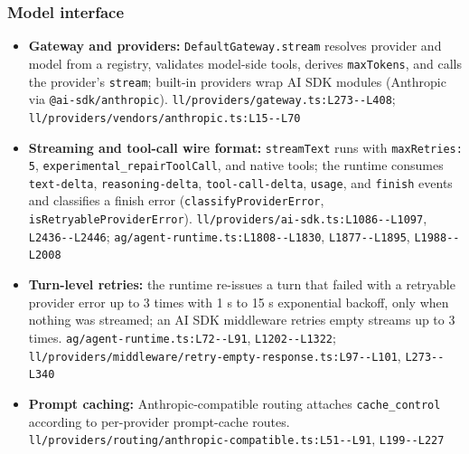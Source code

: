 \subsubsection*{Model interface}
\begin{itemize}
\item \textbf{Gateway and providers:} \texttt{DefaultGateway.\allowbreak{}stream} resolves provider and model from a registry, validates model-side tools, derives \texttt{maxTokens}, and calls the provider's \texttt{stream}; built-in providers wrap AI SDK modules (Anthropic via \texttt{@ai-\allowbreak{}sdk/\allowbreak{}anthropic}). \texttt{ll/\allowbreak{}providers/\allowbreak{}gateway.\allowbreak{}ts:\allowbreak{}L273-\allowbreak{}-\allowbreak{}L408}; \texttt{ll/\allowbreak{}providers/\allowbreak{}vendors/\allowbreak{}anthropic.\allowbreak{}ts:\allowbreak{}L15-\allowbreak{}-\allowbreak{}L70}
\item \textbf{Streaming and tool-call wire format:} \texttt{streamText} runs with \texttt{maxRetries:\allowbreak{} 5}, \texttt{experimental\_\allowbreak{}repairToolCall}, and native tools; the runtime consumes \texttt{text-\allowbreak{}delta}, \texttt{reasoning-\allowbreak{}delta}, \texttt{tool-\allowbreak{}call-\allowbreak{}delta}, \texttt{usage}, and \texttt{finish} events and classifies a finish error (\texttt{classifyProviderError}, \texttt{isRetryableProviderError}). \texttt{ll/\allowbreak{}providers/\allowbreak{}ai-\allowbreak{}sdk.\allowbreak{}ts:\allowbreak{}L1086-\allowbreak{}-\allowbreak{}L1097}, \texttt{L2436-\allowbreak{}-\allowbreak{}L2446}; \texttt{ag/\allowbreak{}agent-\allowbreak{}runtime.\allowbreak{}ts:\allowbreak{}L1808-\allowbreak{}-\allowbreak{}L1830}, \texttt{L1877-\allowbreak{}-\allowbreak{}L1895}, \texttt{L1988-\allowbreak{}-\allowbreak{}L2008}
\item \textbf{Turn-level retries:} the runtime re-issues a turn that failed with a retryable provider error up to 3 times with 1 s to 15 s exponential backoff, only when nothing was streamed; an AI SDK middleware retries empty streams up to 3 times. \texttt{ag/\allowbreak{}agent-\allowbreak{}runtime.\allowbreak{}ts:\allowbreak{}L72-\allowbreak{}-\allowbreak{}L91}, \texttt{L1202-\allowbreak{}-\allowbreak{}L1322}; \texttt{ll/\allowbreak{}providers/\allowbreak{}middleware/\allowbreak{}retry-\allowbreak{}empty-\allowbreak{}response.\allowbreak{}ts:\allowbreak{}L97-\allowbreak{}-\allowbreak{}L101}, \texttt{L273-\allowbreak{}-\allowbreak{}L340}
\item \textbf{Prompt caching:} Anthropic-compatible routing attaches \texttt{cache\_\allowbreak{}control} according to per-provider prompt-cache routes. \texttt{ll/\allowbreak{}providers/\allowbreak{}routing/\allowbreak{}anthropic-\allowbreak{}compatible.\allowbreak{}ts:\allowbreak{}L51-\allowbreak{}-\allowbreak{}L91}, \texttt{L199-\allowbreak{}-\allowbreak{}L227}
\end{itemize}

